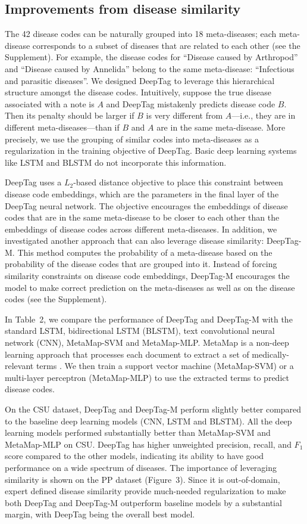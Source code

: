 \documentclass{article}[11pt,oneside]
\begin{document}
\subsection*{Improvements from disease similarity}
The 42 disease codes can be naturally grouped into 18 meta-diseases; each meta-disease corresponds to a subset of diseases that are related to each other (see the Supplement). For example, the disease codes for ``Disease caused by Arthropod'' and ``Disease caused by Annelida'' belong to the same meta-disease: ``Infectious and parasitic diseases''. We designed DeepTag to leverage this hierarchical structure amongst the disease codes. Intuitively, suppose the true disease associated with a note is $A$ and DeepTag mistakenly predicts disease code $B$. Then its penalty should be larger if $B$ is very different from $A$---i.e., they are in different meta-diseases---than if $B$ and $A$ are in the same meta-disease. More precisely, we use the grouping of similar codes into meta-diseases as a regularization in the training objective of DeepTag. Basic deep learning systems like LSTM and BLSTM do not incorporate this information.

DeepTag uses a $L_2$-based distance objective to place this constraint between disease code embeddings, which are the parameters in the final layer of the DeepTag neural network. The objective encourages the embeddings of disease codes that are in the same meta-disease to be closer to each other than the embeddings of disease codes across different meta-diseases. In addition, we investigated another approach that can also leverage disease similarity: DeepTag-M. This method computes the probability of a meta-disease based on the probability of the disease codes that are grouped into it. Instead of forcing similarity constraints on disease code embeddings, DeepTag-M encourages the model to make correct prediction on the meta-diseases as well as on the disease codes (see the Supplement).

In Table~2, we compare the performance of DeepTag and DeepTag-M with the standard LSTM, bidirectional LSTM (BLSTM), text convolutional neural network (CNN), MetaMap-SVM and MetaMap-MLP. MetaMap is a non-deep learning approach that processes each document to extract a set of medically-relevant terms \cite{aronson2010overview}. We then train a support vector machine (MetaMap-SVM) or a multi-layer perceptron (MetaMap-MLP) to use the extracted terms to predict disease codes.

On the CSU dataset, DeepTag and DeepTag-M perform slightly better  compared to the baseline deep learning models (CNN, LSTM and BLSTM). All the deep learning models performed substantially better than MetaMap-SVM and MetaMap-MLP on CSU. DeepTag has higher unweighted precision, recall, and $F_1$ score compared to the other models, indicating its ability to have good performance on a wide spectrum of diseases. The importance of leveraging similarity is shown on the PP dataset (Figure~3).  Since it is out-of-domain, expert defined disease similarity provide much-needed regularization to make both DeepTag and DeepTag-M outperform baseline models by a substantial margin, with DeepTag being the overall best model. 
\end{document}

